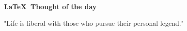 \documentclass[a4paper]{article}
\begin{document}
	\begin{center}
	\begin{large}
		\textbf{\LaTeX\ Thought of the day} \\
	\end{large}
	\end{center}
	
	"Life is liberal with those who pursue their personal legend."
\end{document}
